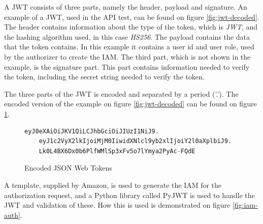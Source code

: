 A JWT consists of three parts, namely the header, payload and signature. An example of a JWT, used in the API test, can be found on figure \ref{fig:jwt-decoded}. The header contains information about the type of the token, which is \textit{JWT}, and the hashing algorithm used, in this case \textit{HS256}. The payload contains the data that the token contains. In this example it contains a user id and user role, used by the authorizer to create the IAM. The third part, which is not shown in the example, is the signature part. This part contains information needed to verify the token, including the secret string needed to verify the token.

The three parts of the JWT is encoded and separated by a period ('.'). The encoded version of the example on figure \ref{fig:jwt-decoded} can be found on figure \ref{fig:jwt-encoded}.

\begin{figure}[H]
    \centering
    \begin{lstlisting}[language=Python]
    eyJ0eXAiOiJKV1QiLCJhbGciOiJIUzI1NiJ9.
    eyJ1c2VyX2lkIjoiMjM0IiwidXNlcl9yb2xlIjoiY2l0aXplbiJ9.
    Lk0L4BX6Dx0b6PlfWMlSp3xFv5o7lYmya2PyAc-FQdE
\end{lstlisting}
    \caption{Encoded JSON Web Tokens}
    \label{fig:jwt-encoded}
\end{figure}

A template, supplied by Amazon, is used to generate the IAM for the authorization request, and a Python library called PyJWT is used to handle the JWT and validation of these. How this is used is demonstrated on figure \ref{fig:iam-auth}.

